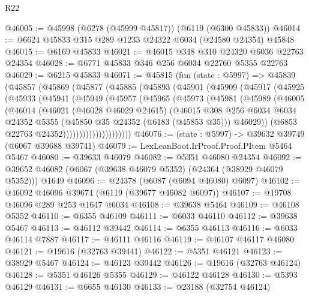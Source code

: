 \begin{lexlean}{R22}
\begin{coremodule}
@46005 := @45998 (@6278 (@45999 @45817)) (@6119 (@6300 @45833))
@46014 := @6624 @45833 @315 @289 @1233 @24322 @6034 (@24580 @24354) @45848
@46015 := @6169 @45833
@46021 := @46015 @348 @310 @24320 @6036 @22763 @24354
@46028 := @6771 @45833 @346 @256 @6034 @22760 @5355 @22763
@46029 := @6215 @45833
@46071 := @45815
    (fun (state : @5997) =>
    @45839
      (@45857
        (@45869
          (@45877
            (@45885
              (@45893
                (@45901
                  (@45909
                    (@45917
                      (@45925
                        (@45933
                          (@45941
                            (@45949
                              (@45957
                                (@45965
                                  (@45973
                                    (@45981
                                      (@45989
                                        (@46005
                                          (@46014
                                            (@46021
                                              (@46028 @46029 @24615)
                                              (@46015
                                                @308
                                                @256
                                                @6034
                                                @6034
                                                @24352
                                                @5355
                                                (@45850 @35 @24352 (@6183 (@45853 @35)))
                                                @46029))
                                            (@6853 @22763 @24352)))))))))))))))))))))
@46076 := (state : @5997) -> @39632 @39749 (@6067 @39688 @39741)
@46079 := LexLeanBoot.IrProof.Proof.PItem @5464 @5467
@46080 := @39633 @46079
@46082 := @5351 @46080 @24354
@46092 := @39652 @46082 (@6067 (@39638 @46079 @5352) (@24364 (@38929 @46079 @5352))) @1649
@46096 := @24378 (@6087 (@6094 @46080) @6097)
@46102 := @46092 @46096 @39674 (@6119 (@39677 @46082 @6097))
@46107 := @19708 @46096 @289 @253 @1647 @6034
@46108 := @39638 @5464
@46109 := @46108 @5352
@46110 := @6355 @46109
@46111 := @6033 @46110
@46112 := @39638 @5467
@46113 := @46112 @39442
@46114 := @6355 @46113
@46116 := @6033 @46114 @7887
@46117 := @46111 @46116
@46119 := @46107 @46117 @46080
@46121 := @19616 (@32763 @39441)
@46122 := @5351 @46121
@46123 := @38929 @5467
@46124 := @46123 @39442
@46126 := @19616 (@32763 @46124)
@46128 := @5351 @46126 @5355
@46129 := @46122 @46128
@46130 := @5393 @46129
@46131 := @6655 @46130
@46133 := @23188 (@32754 @46124)

\end{coremodule}
\end{lexlean}
